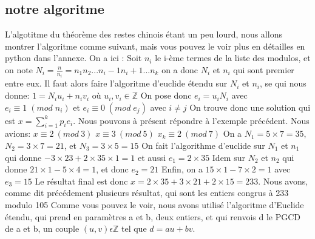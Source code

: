 \documentclass[a4paper, 11pt]{article}
\begin{document}
\subsection{notre algoritme}
L'algotitme du théorème des restes chinois étant un peu lourd, 
nous allons montrer l'algoritme comme suivant, mais vous pouvez le voir plus en détailles en python dans l'annexe.
On a ici :
\newline
Soit $n_i$ le i-ème termes de la liste des modulos, et on note \newline
$ N_i=\frac{n}{n_i}=n_1 n_2 ... n_i-1 n_i+1 ... n_k $   \newline
on a donc $N_i$ et $n_i$  qui sont premier entre eux. \newline
Il faut alors faire l'algoritme d'euclide étendu sur $N_i$ et $n_i$, se qui nous donne: 
$1= N_i u_i + n_i v_i$ 
où 
$u_i, v_i \in  \mathbb{Z} $
\newline
On pose donc $e_i = u_i N_i$ avec $ e_i \equiv 1 \; (mod \; n_i)$ et $ e_i\equiv 0 \; (mod \; e_j)$ avec $ i\neq j$ \newline
On trouve donc une solution qui est $x=\sum_{i = 1}^{k}{p_i e_i} $.\newline
\newline
\newline
Nous pouvons à présent répondre à l'exemple précédent. Nous avions: \newline
$ x\equiv 2 \: (mod \:  3)$ 
\newline
$ x\equiv 3 \: (mod \: 5)$
\newline
$ x_k \equiv 2 \:(mod\: 7)$
\newline
On a $N_1=5\times 7=35$, $N_2=3\times 7=21 $, et $N_3=3\times 5=15$ \newline
On fait l'algorithme d'euclide sur $N_1$ et $n_1$ qui donne $-3\times 23 +2\times 35\times 1= 1 $ et aussi $e_1=2\times 35$ \newline
Idem sur $N_2$ et $n_2$ qui donne $21\times 1 - 5\times 4=1$, et donc $e_2=21$ \newline
Enfin, on a $15\times 1- 7\times 2 = 1 $ avec $e_3=15$ \newline
Le résultat final est donc $x=2\times 35 + 3\times 21 + 2\times 15 =233$. Nous avons, comme dit précédement plusieurs résultat, qui sont les entiers congrus à 233 modulo 105
\newline
\newline
Comme vous pouvez le voir, nous avons utilisé l'algoritme d'Euclide étendu, qui prend en paramètres a et b, deux entiers,
et qui renvois d le PGCD de a et b, un couple $(u,v)\epsilon\mathbb{Z} $ tel que $d=au+bv$.
\end{document}
